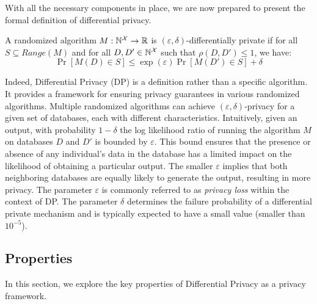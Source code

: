 With all the necessary components in place, we are now prepared to present the formal definition of differential privacy.
\begin{definition}
  \label{def:dp}
  A randomized algorithm $M: \mathbb{N}^\mathcal{X} \rightarrow \mathbb{R}$ is $(\varepsilon, \delta)$-differentially private if for all ${S} \subseteq Range(M)$ and for  all $D, D' \in \mathbb{N}^\mathcal{X}$ such that $\rho(D, D') \leq 1$, we have:
  \begin{equation*}
    \Pr[M(D) \in S] \leq \exp(\varepsilon)\Pr[M(D') \in S] + \delta
  \end{equation*}
\end{definition}
\noindent
Indeed, Differential Privacy (DP) is a definition rather than a specific algorithm.
It provides a framework for ensuring privacy guarantees in various randomized algorithms. Multiple randomized algorithms can achieve $(\varepsilon, \delta)$-privacy for a given set of databases, each with different characteristics. 
Intuitively, given an output, with probability $1-\delta$ the log likelihood ratio of running the algorithm $M$ on databases $D$ and $D'$ is bounded by $\varepsilon$.
This bound ensures that the presence or absence of any individual's data in the database has a limited impact on the likelihood of obtaining a particular output.
The smaller $\varepsilon$ implies that both neighboring databases are equally likely to generate the output, resulting in more privacy.
The parameter $\varepsilon$ is commonly referred to as \textit{privacy loss} within the context of DP.
The parameter $\delta$ determines the failure probability of a differential private mechanism and is typically expected to have a small value (\ie smaller than $10^{-5}$).


%
%

\subsection{Properties}\label{subsec:background-dp-properties}
In this section, we explore the key properties of Differential Privacy as a privacy framework.



